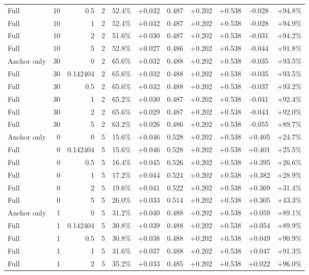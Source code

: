 \begin{table}[htbp]
\begin{tabular}{lrrrccccccc}
Full & 10 & 0.5 & 2 & 52.4\% & +0.032 & 0.487 & +0.202 & +0.538 & -0.028 & +94.8\% \\
Full & 10 & 1 & 2 & 52.4\% & +0.032 & 0.487 & +0.202 & +0.538 & -0.028 & +94.9\% \\
Full & 10 & 2 & 2 & 51.6\% & +0.030 & 0.487 & +0.202 & +0.538 & -0.031 & +94.2\% \\
Full & 10 & 5 & 2 & 52.8\% & +0.027 & 0.486 & +0.202 & +0.538 & -0.044 & +91.8\% \\
Anchor only & 30 & 0 & 2 & 65.6\% & +0.032 & 0.488 & +0.202 & +0.538 & -0.035 & +93.5\% \\
Full & 30 & 0.142404 & 2 & 65.6\% & +0.032 & 0.488 & +0.202 & +0.538 & -0.035 & +93.5\% \\
Full & 30 & 0.5 & 2 & 65.6\% & +0.032 & 0.488 & +0.202 & +0.538 & -0.037 & +93.2\% \\
Full & 30 & 1 & 2 & 65.2\% & +0.030 & 0.487 & +0.202 & +0.538 & -0.041 & +92.4\% \\
Full & 30 & 2 & 2 & 65.6\% & +0.029 & 0.487 & +0.202 & +0.538 & -0.043 & +92.0\% \\
Full & 30 & 5 & 2 & 63.2\% & +0.026 & 0.486 & +0.202 & +0.538 & -0.055 & +89.7\% \\
Anchor only & 0 & 0 & 5 & 15.6\% & +0.046 & 0.528 & +0.202 & +0.538 & +0.405 & +24.7\% \\
Full & 0 & 0.142404 & 5 & 15.6\% & +0.046 & 0.528 & +0.202 & +0.538 & +0.401 & +25.5\% \\
Full & 0 & 0.5 & 5 & 16.4\% & +0.045 & 0.526 & +0.202 & +0.538 & +0.395 & +26.6\% \\
Full & 0 & 1 & 5 & 17.2\% & +0.044 & 0.524 & +0.202 & +0.538 & +0.382 & +28.9\% \\
Full & 0 & 2 & 5 & 19.6\% & +0.041 & 0.522 & +0.202 & +0.538 & +0.369 & +31.4\% \\
Full & 0 & 5 & 5 & 26.0\% & +0.033 & 0.514 & +0.202 & +0.538 & +0.305 & +43.3\% \\
Anchor only & 1 & 0 & 5 & 31.2\% & +0.040 & 0.488 & +0.202 & +0.538 & +0.059 & +89.1\% \\
Full & 1 & 0.142404 & 5 & 30.8\% & +0.039 & 0.488 & +0.202 & +0.538 & +0.054 & +89.9\% \\
Full & 1 & 0.5 & 5 & 30.8\% & +0.038 & 0.488 & +0.202 & +0.538 & +0.049 & +90.9\% \\
Full & 1 & 1 & 5 & 31.6\% & +0.037 & 0.488 & +0.202 & +0.538 & +0.047 & +91.3\% \\
Full & 1 & 2 & 5 & 35.2\% & +0.033 & 0.485 & +0.202 & +0.538 & +0.022 & +96.0\% \\

\end{tabular}
\end{table}
